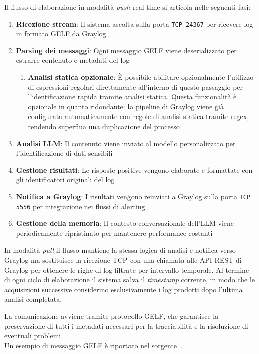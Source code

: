 \documentclass[12pt,twoside]{report}
\begin{document}
\clearpage

Il flusso di elaborazione in modalità \textit{push} real-time si articola nelle seguenti fasi:

\begin{enumerate}
    \item \textbf{Ricezione stream}: Il sistema ascolta sulla porta \texttt{TCP 24367} per ricevere log in formato GELF da Graylog
    \item \textbf{Parsing dei messaggi}: Ogni messaggio GELF viene deserializzato per estrarre contenuto e metadati del log
    \begin{enumerate}
        \item \textbf{Analisi statica opzionale}: È possibile abilitare opzionalmente l'utilizzo di espressioni regolari direttamente all'interno di questo passaggio per l'identificazione rapida tramite analisi statica. Questa funzionalità è opzionale in quanto ridondante: la pipeline di Graylog viene già configurata automaticamente con regole di analisi statica tramite regex, rendendo superflua una duplicazione del processo
    \end{enumerate}
    \item \textbf{Analisi LLM}: Il contenuto viene inviato al modello personalizzato per l'identificazione di dati sensibili
    \item \textbf{Gestione risultati}: Le risposte positive vengono elaborate e formattate con gli identificatori originali del log
    \item \textbf{Notifica a Graylog}: I risultati vengono reinviati a Graylog sulla porta \texttt{TCP 5556} per integrazione nei flussi di alerting
    \item \textbf{Gestione della memoria}: Il contesto conversazionale dell'LLM viene periodicamente ripristinato per mantenere performance costanti
\end{enumerate}

In modalità \textit{pull} il flusso mantiene la stessa logica di analisi e notifica verso Graylog ma sostituisce la ricezione TCP con una chiamata alle API REST di Graylog per ottenere le righe di log filtrate per intervallo temporale. Al termine di ogni ciclo di elaborazione il sistema salva il \textit{timestamp} corrente, in modo che le acquisizioni successive considerino esclusivamente i log prodotti dopo l'ultima analisi completata.

La comunicazione avviene tramite protocollo GELF, che garantisce la preservazione di tutti i metadati necessari per la tracciabilità e la risoluzione di eventuali problemi.\\
Un esempio di messaggio GELF è riportato nel sorgente~.
\end{document}
